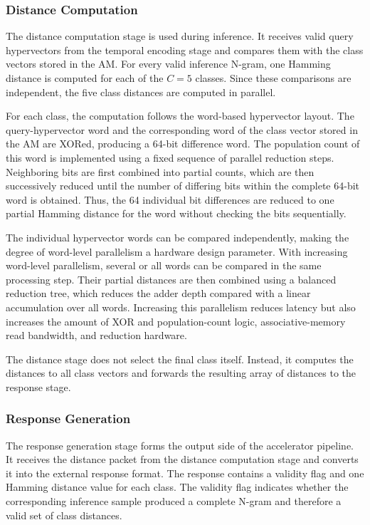    \subsubsection{Distance Computation}
    
    The distance computation stage is used during inference. It receives valid query hypervectors from the temporal encoding stage and compares them with the class vectors stored in the \ac{AM}. 
    For every valid inference N-gram, one Hamming distance is computed for each of the $C=5$ classes. Since these comparisons are independent, the five class distances are computed in parallel.

    For each class, the computation follows the word-based hypervector layout. The query-hypervector word and the corresponding word of the class vector stored in the \ac{AM} are XORed, producing a 64-bit difference word. The population count of this word is implemented using a fixed sequence of parallel reduction steps. Neighboring bits are first combined into partial counts, which are then successively reduced until the number of differing bits within the complete 64-bit word is obtained. Thus, the 64 individual bit differences are reduced to one partial Hamming distance for the word without checking the bits sequentially.
    
    The individual hypervector words can be compared independently, making the degree of word-level parallelism a hardware design parameter. With increasing word-level parallelism, several or all words can be compared in the same processing step. Their partial distances are then combined using a balanced reduction tree, which reduces the adder depth compared with a linear accumulation over all words. Increasing this parallelism reduces latency but also increases the amount of XOR and population-count logic, associative-memory read bandwidth, and reduction hardware.

    The distance stage does not select the final class itself. Instead, it computes the distances to all class vectors and forwards the resulting array of distances to the response stage. 
    
    \subsubsection{Response Generation}
        The response generation stage forms the output side of the accelerator pipeline. It receives the distance packet from the distance computation stage and converts it into the external response format. The response contains a validity flag and one Hamming distance value for each class. The validity flag indicates whether the corresponding inference sample produced a complete N-gram and therefore a valid set of class distances. 
        
